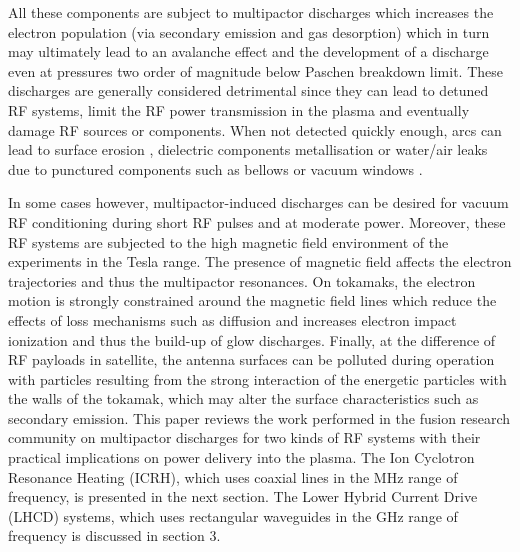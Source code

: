 All these components are subject to multipactor discharges which increases the electron population (via secondary emission and gas desorption) which in turn may ultimately lead to an avalanche effect and the development of a discharge even at pressures two order of magnitude below Paschen breakdown limit. These discharges are generally considered detrimental since they can lead to detuned RF systems, limit the RF power transmission in the plasma and eventually damage RF sources or components. When not detected quickly enough, arcs can lead to surface erosion , dielectric components metallisation  or water/air leaks due to punctured components such as bellows  or vacuum windows . 

In some cases however, multipactor-induced discharges can be desired for vacuum RF conditioning during short RF pulses and at moderate power. Moreover, these RF systems are subjected to the high magnetic field environment of the experiments in the Tesla range. The presence of magnetic field affects the electron trajectories and thus the multipactor resonances. On tokamaks, the electron motion is strongly constrained around the magnetic field lines which reduce the effects of loss mechanisms such as diffusion and increases electron impact ionization and thus the build-up of glow discharges. Finally, at the difference of RF payloads in satellite, the antenna surfaces can be polluted during operation with particles resulting from the strong interaction of the energetic particles with the walls of the tokamak, which may alter the surface characteristics such as secondary emission. This paper reviews the work performed in the fusion research community on multipactor discharges for two kinds of RF systems with their practical implications on power delivery into the plasma. The Ion Cyclotron Resonance Heating (ICRH), which uses coaxial lines in the MHz range of frequency, is presented in the next section. The Lower Hybrid Current Drive (LHCD) systems, which uses rectangular waveguides in the GHz range of frequency is discussed in section 3. 






